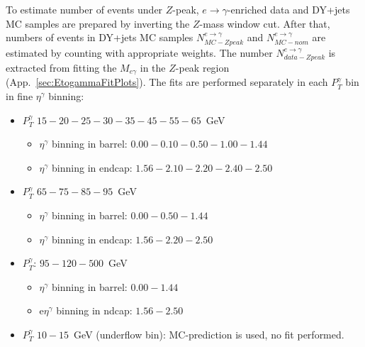 To estimate number of events under $Z$-peak, $e\rightarrow\gamma$-enriched data and DY+jets MC samples are prepared by inverting the $Z$-mass
window cut. After that, numbers of events in DY+jets MC samples $N_{MC-Zpeak}^{e\rightarrow\gamma}$ and $N_{MC-nom}^{e\rightarrow\gamma}$ are estimated by counting with appropriate weights. The number $N_{data-Zpeak}^{e\rightarrow\gamma}$ is extracted from fitting the $M_{e\gamma}$ in the $Z$-peak region (App.~\ref{sec:EtogammaFitPlots}). The fits are performed separately in each $P_T^\gamma$ bin in fine $\eta^\gamma$ binning:
     \begin{itemize}
        \item $P_T^\gamma$ $15-20-25-30-35-45-55-65$~GeV
           \begin{itemize}
              \item $\eta^\gamma$ binning in barrel: $0.00-0.10-0.50-1.00-1.44$
              \item $\eta^\gamma$ binning in endcap: $1.56-2.10-2.20-2.40-2.50$
           \end{itemize}
        \item $P_T^\gamma$ $65-75-85-95$~GeV
          \begin{itemize}
              \item $\eta^\gamma$ binning in barrel: $0.00-0.50-1.44$
              \item $\eta^\gamma$ binning in endcap: $1.56-2.20-2.50$
           \end{itemize}
        \item $P_T^\gamma$: $95-120-500$~GeV
          \begin{itemize}
              \item $\eta^\gamma$ binning in barrel: $0.00-1.44$
              \item e$\eta^\gamma$ binning in ndcap: $1.56-2.50$
           \end{itemize}
        \item $P_T^\gamma$ $10-15$~GeV (underflow bin): MC-prediction is used, no fit performed.
     \end{itemize}

